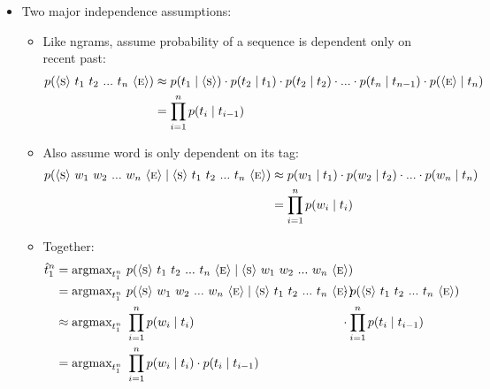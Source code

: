 \documentclass[11pt,letterpaper]{article}
\newcommand{\ngramstart}{\ensuremath{\langle \textsc{s} \rangle}}
\newcommand{\ngramend}{\ensuremath{\langle \textsc{e} \rangle}}
\begin{document}
\begin{itemize}
  \item Two major independence assumptions:
    \begin{itemize}
      \item Like ngrams, assume probability of a sequence is dependent only on recent past:
        \begin{align*}
          p(\ngramstart~t_1~t_2~...~t_n~\ngramend) 
                    &\approx p(t_1 \mid \ngramstart) \cdot 
                              p(t_2 \mid t_1) \cdot 
                              p(t_2 \mid t_2) \cdot 
                              ...  \cdot 
                              p(t_n \mid t_{n-1}) \cdot 
                              p(\ngramend \mid t_n) \\
                    &= \prod_{i=1}^n p(t_i \mid t_{i-1})
        \end{align*}
      \item Also assume word is only dependent on its tag: \vspace{2mm}
        \begin{align*}
          p(\ngramstart~w_1~w_2~...~w_n~\ngramend \mid \ngramstart~t_1~t_2~...~t_n~\ngramend) 
                    &\approx p(w_1 \mid t_1) \cdot 
                             p(w_2 \mid t_2) \cdot 
                             ...  \cdot 
                             p(w_n \mid t_n) \\
                    &= \prod_{i=1}^n p(w_i \mid t_i)
        \end{align*}
      \item Together: 
        \begin{align*}
        \hat{t}_1^n &= \text{argmax}_{t_1^n}~p(\ngramstart~t_1~t_2~...~t_n~\ngramend \mid \ngramstart~w_1~w_2~...~w_n~\ngramend) \\
                    &= \text{argmax}_{t_1^n}~p(\ngramstart~w_1~w_2~...~w_n~\ngramend \mid \ngramstart~t_1~t_2~...~t_n~\ngramend) &&\hspace{-7mm}\cdot p(\ngramstart~t_1~t_2~...~t_n~\ngramend) \\
                    &\approx \text{argmax}_{t_1^n}~\prod_{i=1}^n p(w_i \mid t_i) &&\hspace{-7mm}\cdot \prod_{i=1}^n p(t_i \mid t_{i-1}) \\
                    &= \text{argmax}_{t_1^n}~\prod_{i=1}^n p(w_i \mid t_i) \cdot p(t_i \mid t_{i-1})
        \end{align*}
    \end{itemize}
\end{itemize}
\end{document}
